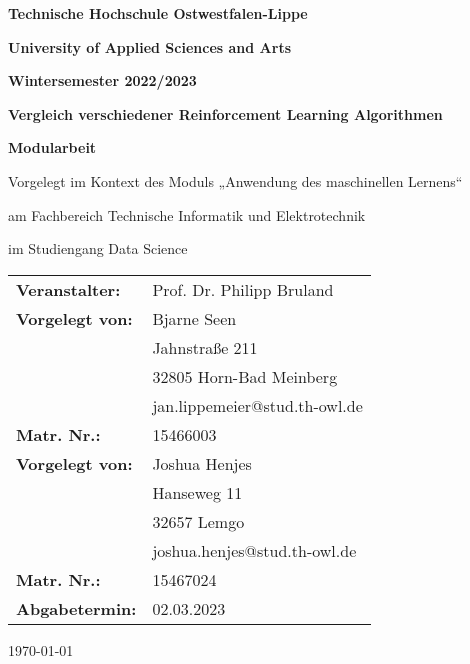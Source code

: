 \documentclass[../documentation.tex]{subfiles}
\begin{document}
\begin{titlepage}
    \begin{center}   
    {\textbf{Technische Hochschule Ostwestfalen-Lippe}}\\
    {\textbf{University of Applied Sciences and Arts}\par}\vspace{1.5cm}
    {\Large\bfseries Wintersemester 2022/2023\par}\vspace{1.5cm}
    {\huge\bfseries Vergleich verschiedener Reinforcement Learning Algorithmen \par}
    \vspace{1.5cm}
    {\Large\bfseries Modularbeit}\\
    {\large Vorgelegt im Kontext des Moduls „Anwendung des maschinellen Lernens“\par} \vspace{1cm}
    {\large am Fachbereich Technische Informatik und Elektrotechnik}\\
    {\large im Studiengang Data Science\par} \vspace{2cm}
    \end{center}
    \vfill
    \begin{tabular}{l l}
    \textbf{Veranstalter:}& {Prof. Dr. Philipp Bruland}\\ 
    \textbf{Vorgelegt von:}& {Bjarne Seen}\\ 
    \textbf{} & {Jahnstraße 211} \\
    \textbf{} & {32805 Horn-Bad Meinberg} \\
    \textbf{} & {jan.lippemeier@stud.th-owl.de} \\
    \textbf{Matr. Nr.:} & {15466003} \\
    \textbf{Vorgelegt von:}& {Joshua Henjes}\\ 
    \textbf{} & {Hanseweg 11} \\
    \textbf{} & {32657 Lemgo} \\
    \textbf{} & {joshua.henjes@stud.th-owl.de} \\
    \textbf{Matr. Nr.:} & {15467024} \\
    \textbf{Abgabetermin:} & {02.03.2023} 
    \end{tabular}   
    \begin{center}
    \vfill

    {\large\today\par}
    \end{center}
\end{titlepage}
\end{document}
